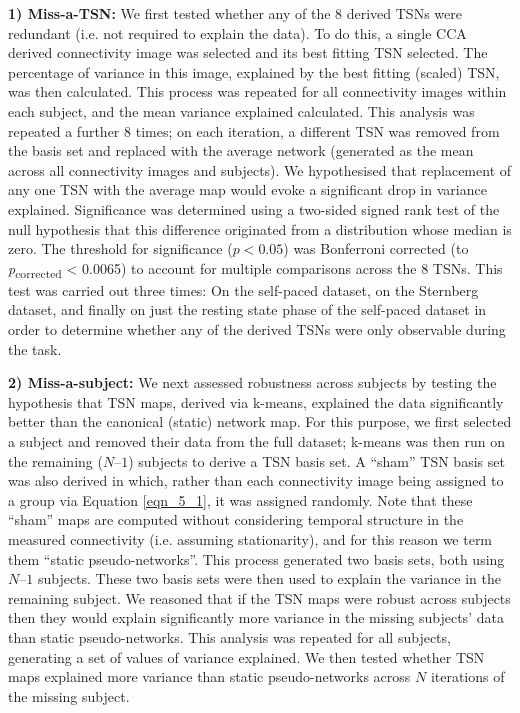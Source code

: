 \textbf{1) Miss-a-TSN:}
We first tested whether any of the 8 derived TSNs were redundant (i.e. not required to explain the data). To do this, a single CCA derived connectivity image was selected and its best fitting TSN selected. The percentage of variance in this image, explained by the best fitting (scaled) TSN, was then calculated. This process was repeated for all connectivity images within each subject, and the mean variance explained calculated. This analysis was repeated a further 8 times; on each iteration, a different TSN was removed from the basis set and replaced with the average network (generated as the mean across all connectivity images and subjects). We hypothesised that replacement of any one TSN with the average map would evoke a significant drop in variance explained. Significance was determined using a two-sided signed rank test of the null hypothesis that this difference originated from a distribution whose median is zero. The threshold for significance ($p < 0.05$) was Bonferroni corrected (to \textit{p}\textsubscript{corrected} < 0.0065) to account for multiple comparisons across the 8 TSNs. This test was carried out three times: On the self-paced dataset, on the Sternberg dataset, and finally on just the resting state phase of the self-paced dataset in order to determine whether any of the derived TSNs were only observable during the task.

\textbf{2) Miss-a-subject:}
We next assessed robustness across subjects by testing the hypothesis that TSN maps, derived via k-means, explained the data significantly better than the canonical (static) network map. For this purpose, we first selected a subject and removed their data from the full dataset; k-means was then run on the remaining ($N – 1$) subjects to derive a TSN basis set. A “sham” TSN basis set was also derived in which, rather than each connectivity image being assigned to a group via Equation \ref{eqn_5_1}, it was assigned randomly. Note that these “sham” maps are computed without considering temporal structure in the measured connectivity (i.e. assuming stationarity), and for this reason we term them “static pseudo-networks”. This process generated two basis sets, both using $N – 1$ subjects. These two basis sets were then used to explain the variance in the remaining subject. We reasoned that if the TSN maps were robust across subjects then they would explain significantly more variance in the missing subjects’ data than static pseudo-networks. This analysis was repeated for all subjects, generating a set of values of variance explained. We then tested whether TSN maps explained more variance than static pseudo-networks across $N$ iterations of the missing subject.

